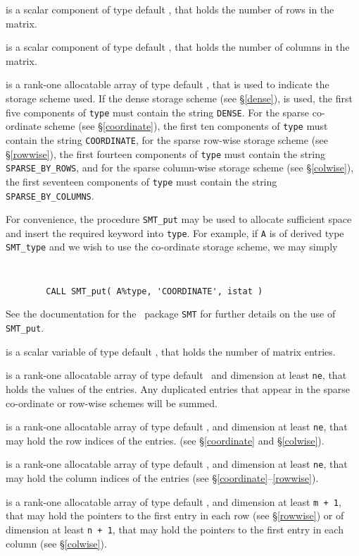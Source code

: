 \documentclass{galahad}
\begin{document}
\begin{description}

 is a scalar component of type default \integer, 
that holds the number of rows in the matrix. 
 
 is a scalar component of type default \integer, 
that holds the number of columns in the matrix. 
 
 is a rank-one allocatable array of type default \character, that
is used to indicate the storage scheme used. If the dense storage scheme 
(see \S\ref{dense}), is used, 
the first five components of {\tt type} must contain the
string {\tt DENSE}.
For the sparse co-ordinate scheme (see \S\ref{coordinate}), 
the first ten components of {\tt type} must contain the
string {\tt COORDINATE}, 
for the sparse row-wise storage scheme (see \S\ref{rowwise}),
the first fourteen components of {\tt type} must contain the
string {\tt SPARSE\_BY\_ROWS}, and
for the sparse column-wise storage scheme (see \S\ref{colwise}),
the first seventeen components of {\tt type} must contain the
string {\tt SPARSE\_BY\_COLUMNS}.

For convenience, the procedure {\tt SMT\_put} 
may be used to allocate sufficient space and insert the required keyword
into {\tt type}.
For example, if {\tt A} is of derived type {\tt SMT\_type}
and we wish to use the co-ordinate storage scheme, we may simply
{\tt 
\begin{verbatim}
        CALL SMT_put( A%type, 'COORDINATE', istat )
\end{verbatim}
}
\noindent
See the documentation for the \galahad\ package {\tt SMT} 
for further details on the use of {\tt SMT\_put}.

 is a scalar variable of type default \integer, that
holds the number of matrix entries.

 is a rank-one allocatable array of type default \realdp\, 
and dimension at least {\tt ne}, that holds the values of the entries. 
Any duplicated entries that appear in the sparse 
co-ordinate or row-wise schemes will be summed. 

 is a rank-one allocatable array of type default \integer, 
and dimension at least {\tt ne}, that may hold the row indices of the entries. 
(see \S\ref{coordinate} and \S\ref{colwise}).

 is a rank-one allocatable array of type default \integer, 
and dimension at least {\tt ne}, that may hold the column indices of the entries
(see \S\ref{coordinate}--\ref{rowwise}).

 is a rank-one allocatable array of type default \integer, 
and dimension at least {\tt m + 1}, that may hold the pointers to
the first entry in each row (see \S\ref{rowwise}) or of dimension
at least {\tt n + 1}, that may hold the pointers to
the first entry in each column (see \S\ref{colwise}).

\end{description}
\end{document}
